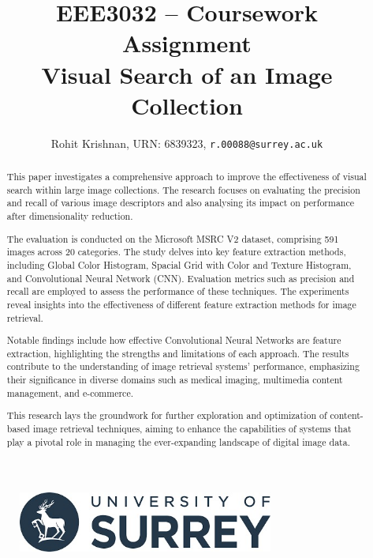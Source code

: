 \documentclass[10pt,a4paper,onecolumn]{article} %
\begin{document}
\begin{figure}
  \begin{center}
    \includegraphics[width=0.75\textwidth]{./assets/university_of_surrey_logo.jpeg}
  \end{center}
\end{figure}

\title{EEE3032 – Coursework Assignment \\ Visual Search of an Image Collection }

\author{Rohit Krishnan, {URN: 6839323},
{\tt r.00088@surrey.ac.uk}
}
\maketitle

\newpage

\begin{abstract}
This paper investigates a comprehensive approach to improve the effectiveness of visual search within large
image collections. The research focuses on evaluating the precision and recall of various image descriptors
and also analysing its impact on performance after dimensionality reduction.

The evaluation is conducted on the Microsoft MSRC V2 dataset, comprising 591 images across 20 categories. The study
delves into key feature extraction methods, including Global Color Histogram, Spacial Grid with Color and
Texture Histogram, and Convolutional Neural Network (CNN). Evaluation metrics such as precision and recall are
employed to assess the performance of these techniques. The experiments reveal insights into the effectiveness of
different feature extraction methods for image retrieval.

Notable findings include how effective Convolutional Neural Networks are feature extraction, highlighting the
strengths and limitations of  each approach. The results contribute to the understanding of image retrieval
systems' performance, emphasizing their significance in diverse domains such as medical imaging, multimedia content
management, and e-commerce.

This research lays the groundwork for further exploration and optimization of content-based image retrieval
techniques, aiming to enhance the capabilities of systems that play a pivotal role in managing the ever-expanding
landscape of digital image data.

\end{abstract}
\end{document}
